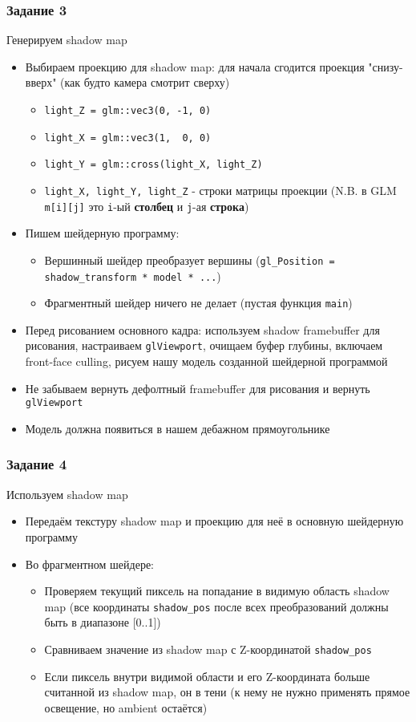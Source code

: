 \documentclass{beamer}
\begin{document}
\begin{frame}[fragile]
\frametitle{Задание 3}
\fontsize{10pt}{10pt}
Генерируем shadow map
\begin{itemize}
\item Выбираем проекцию для shadow map: для начала сгодится проекция "снизу-вверх" (как будто камера смотрит сверху)
\pause
\begin{itemize}
\item \verb|light_Z = glm::vec3(0, -1, 0)|
\item \verb|light_X = glm::vec3(1,  0, 0)|
\item \verb|light_Y = glm::cross(light_X, light_Z)|
\pause
\item \verb|light_X, light_Y, light_Z| - строки матрицы проекции (N.B. в GLM \verb|m[i][j]| это \verb|i|-ый \textbf{столбец} и \verb|j|-ая \textbf{строка})
\end{itemize}
\pause
\item Пишем шейдерную программу:
\pause
\begin{itemize}
\item Вершинный шейдер преобразует вершины (\verb|gl_Position = shadow_transform * model * ...|)
\item Фрагментный шейдер ничего не делает (пустая функция \verb|main|)
\end{itemize}
\pause
\item Перед рисованием основного кадра: используем shadow framebuffer для рисования, настраиваем \verb|glViewport|, очищаем буфер глубины, включаем front-face culling, рисуем нашу модель созданной шейдерной программой
\pause
\item Не забываем вернуть дефолтный framebuffer для рисования и вернуть \verb|glViewport|
\pause
\item Модель должна появиться в нашем дебажном прямоугольнике
\end{itemize}
\end{frame}

\begin{frame}[fragile]
\frametitle{Задание 4}
\fontsize{10pt}{10pt}
Используем shadow map
\begin{itemize}
\item Передаём текстуру shadow map и проекцию для неё в основную шейдерную программу
\pause
\item Во фрагментном шейдере:
\begin{itemize}
\item Проверяем текущий пиксель на попадание в видимую область shadow map (все координаты \verb|shadow_pos| после всех преобразований должны быть в диапазоне [0..1])
\item Сравниваем значение из shadow map с Z-координатой \verb|shadow_pos|
\item Если пиксель внутри видимой области и его Z-координата больше считанной из shadow map, он в тени (к нему не нужно применять прямое освещение, но ambient остаётся)
\end{itemize}
\end{itemize}
\end{frame}
\end{document}
